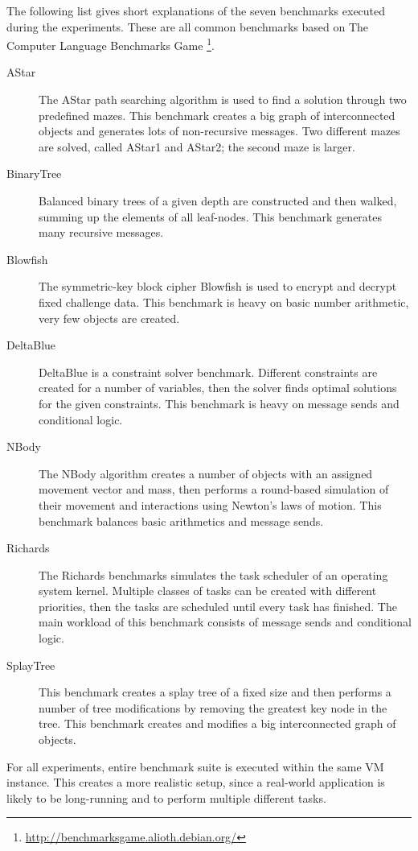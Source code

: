 \documentclass[english,10pt]{sigplanconf}
\begin{document}
The following list gives short explanations of the seven benchmarks
executed during the experiments.  These are all common benchmarks
based on The Computer Language Benchmarks Game%
\footnote{\url{http://benchmarksgame.alioth.debian.org/}}.
\begin{description}
\item[AStar]{The AStar path searching algorithm is used to find a
    solution through two predefined mazes. This benchmark creates a
    big graph of interconnected objects and generates lots of
    non-recursive messages. Two different mazes are solved, called
    AStar1 and AStar2; the second maze is larger.}
\item[BinaryTree]{Balanced binary trees of a given depth are
    constructed and then walked, summing up the elements of all
    leaf-nodes. This benchmark generates many recursive messages.}
\item[Blowfish]{The symmetric-key block cipher Blowfish is used to
    encrypt and decrypt fixed challenge data. This benchmark is heavy
    on basic number arithmetic, very few objects are created.}
\item[DeltaBlue]{DeltaBlue is a constraint solver benchmark. Different
    constraints are created for a number of variables, then the solver
    finds optimal solutions for the given constraints. This benchmark
    is heavy on message sends and conditional logic.}
\item[NBody]{The NBody algorithm creates a number of objects with an
    assigned movement vector and mass, then performs a round-based
    simulation of their movement and interactions using Newton's laws
    of motion. This benchmark balances basic arithmetics and message
    sends.}
\item[Richards]{The Richards benchmarks simulates the task scheduler
    of an operating system kernel. Multiple classes of tasks can be
    created with different priorities, then the tasks are scheduled
    until every task has finished. The main workload of this benchmark
    consists of message sends and conditional logic.}
\item[SplayTree]{This benchmark creates a splay tree of a fixed size
    and then performs a number of tree modifications by removing the
    greatest key node in the tree. This benchmark creates and modifies
    a big interconnected graph of objects.}
\end{description}

For all experiments, entire benchmark suite is executed within the
same VM instance.  This creates a more realistic setup, since a
real-world application is likely to be long-running and to perform
multiple different tasks.
\end{document}
